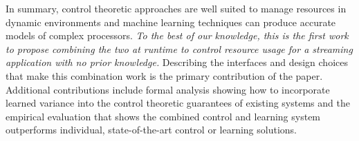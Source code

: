 In summary, control theoretic approaches are well suited to manage
resources in dynamic environments and machine learning techniques can
produce accurate models of complex processors.  \emph{To the best of
  our knowledge, this is the first work to propose combining the two
  at runtime to control resource usage for a streaming application
  with no prior knowledge.}  Describing the interfaces and design
choices that make this combination work is the primary contribution of
the paper.  Additional contributions include formal analysis showing
how to incorporate learned variance into the control theoretic
guarantees of existing systems and the empirical evaluation that shows
the combined control and learning system outperforms individual,
state-of-the-art control or learning solutions.

